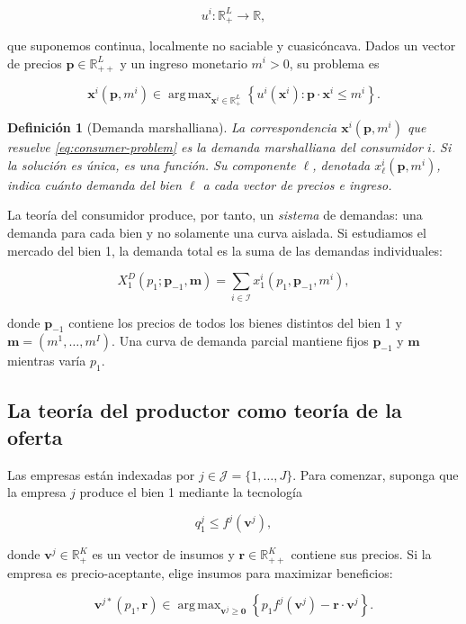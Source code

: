 \documentclass[12pt]{article}
\theoremstyle{cideplain}
\theoremstyle{cidedef}
\newtheorem{definition}[theorem]{Definición}
\DeclareMathOperator*{\argmax}{arg\,max}
\newcommand{\R}{\mathbb{R}}
\newcommand{\p}{\mathbf{p}}
\newcommand{\x}{\mathbf{x}}
\begin{document}
\[
  u^i:\R_+^L\longrightarrow\R,
\]

que suponemos continua, localmente no saciable y cuasicóncava. Dados un vector de
precios \(\p\in\R_{++}^L\) y un ingreso monetario \(m^i>0\), su problema es

\begin{equation}
  \x^i(\p,m^i)
  \in
  \argmax_{\x^i\in\R_+^L}
  \left\{u^i(\x^i):\p\cdot\x^i\leq m^i\right\}.
  \label{eq:consumer-problem}
\end{equation}

\begin{definition}[Demanda marshalliana]
La correspondencia \(\x^i(\p,m^i)\) que resuelve \eqref{eq:consumer-problem} es la
\emph{demanda marshalliana} del consumidor \(i\). Si la solución es única, es una función.
Su componente \(\ell\), denotada \(x_\ell^i(\p,m^i)\), indica cuánto demanda del bien
\(\ell\) a cada vector de precios e ingreso.
\end{definition}

La teoría del consumidor produce, por tanto, un \emph{sistema} de demandas: una demanda
para cada bien y no solamente una curva aislada. Si estudiamos el mercado del bien 1,
la demanda total es la suma de las demandas individuales:

\begin{equation}
  X_1^D(p_1;\p_{-1},\bm m)
  =\sum_{i\in\mathcal I}x_1^i(p_1,\p_{-1},m^i),
  \label{eq:market-demand}
\end{equation}

donde \(\p_{-1}\) contiene los precios de todos los bienes distintos del bien 1 y
\(\bm m=(m^1,\ldots,m^I)\). Una curva de demanda parcial mantiene fijos
\(\p_{-1}\) y \(\bm m\) mientras varía \(p_1\).

\subsection{La teoría del productor como teoría de la oferta}

Las empresas están indexadas por \(j\in\mathcal J=\{1,\ldots,J\}\). Para comenzar,
suponga que la empresa \(j\) produce el bien 1 mediante la tecnología

\[
  q_1^j\leq f^j(\bm v^j),
\]

donde \(\bm v^j\in\R_+^K\) es un vector de insumos y \(\bm r\in\R_{++}^K\) contiene
sus precios. Si la empresa es precio-aceptante, elige insumos para maximizar beneficios:

\begin{equation}
  \bm v^{j*}(p_1,\bm r)
  \in
  \argmax_{\bm v^j\geq\bm 0}
  \left\{p_1f^j(\bm v^j)-\bm r\cdot\bm v^j\right\}.
  \label{eq:firm-problem-partial}
\end{equation}
\end{document}
